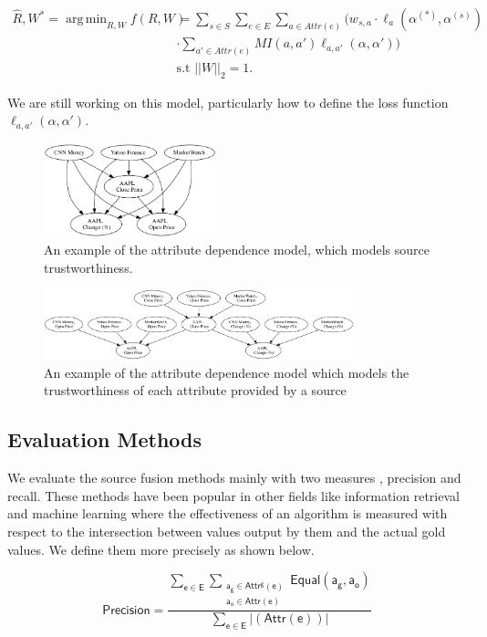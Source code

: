 \documentclass{acm_proc_article-sp}
\DeclareMathOperator*{\argmin}{arg\,min}
\begin{document}
\begin{align}
\hat{R}, W^* = \argmin_{R,W} f(R, W) & = \sum_{s \in S} \sum_{e \in E} \sum_{a \in Attr(e)} \Bigg ( w_{s,a} \cdot \ell_a(\alpha^{(*)}, \alpha^{(s)}) \nonumber \\
&  \cdot \sum_{a' \in Attr(e)} MI(a,a') \ell_{a,a'}(\alpha,\alpha')  \Bigg ) \\
& \text{s.t } ||W||_2 =1. \nonumber 
\end{align}

We are still working on this model, particularly how to define the loss function $\ell_{a,a'}(\alpha,\alpha')$. 



\begin{figure}
\centering
\includegraphics[width=5cm]{bn1.png}
\caption{An example of the attribute dependence model, which models source trustworthiness.}
\end{figure}

\begin{figure}
\centering
\includegraphics[width=9cm]{bn2.png}
\caption{An example of the attribute dependence model which models the trustworthiness of each attribute provided by a source}
\end{figure}

\subsection{Evaluation Methods}
We evaluate the source fusion methods mainly with two measures , precision and recall. These methods have been popular in other fields like information retrieval and machine learning where the effectiveness of an algorithm is measured with respect to the intersection between values output by them and the actual gold values. 
We define them more precisely as shown below.

\begin{equation}
\mathsf {Precision =\frac {\sum_{e \in E}  \sum_{\substack{a_g \in Attr^g(e) \\ a_o \in Attr(e)}} Equal(a_g,a_o)}{\sum_{e \in E}  |(Attr(e))| }}
\end{equation}
\end{document}
